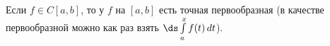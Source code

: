 
    	Если $f\in C[a,b]$, то у $f$ на $[a,b]$ есть точная первообразная (в качестве первообразной можно как раз взять
    	$\ds\int\limits_a^xf(t)\,dt$).
    